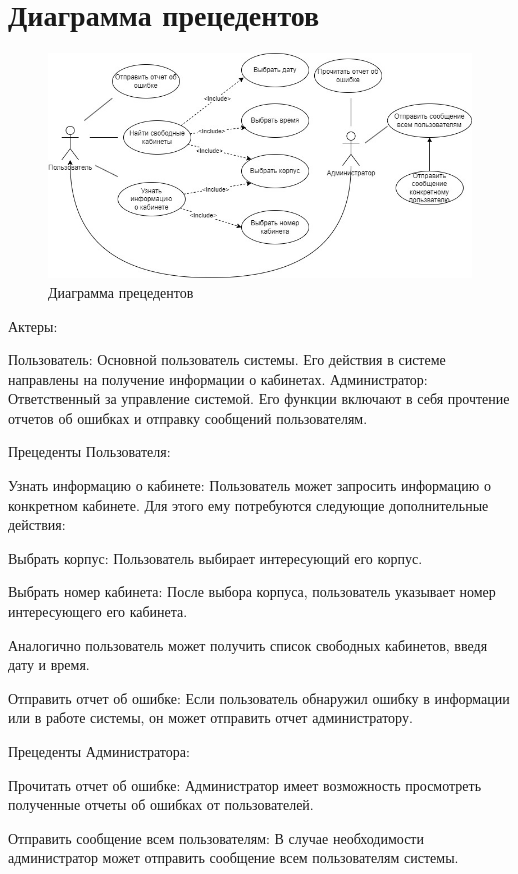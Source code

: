 \chapter{Диаграмма прецедентов}

\begin{figure}[h]
    \centering
    \includegraphics[scale=0.6]{img/prec}
    \caption{Диаграмма прецедентов}
    \label{fig:cp}
\end{figure}

Актеры:

Пользователь: Основной пользователь системы. Его действия в системе направлены
на получение информации о кабинетах.
Администратор: Ответственный за управление системой. Его функции включают в себя
прочтение отчетов об ошибках и отправку сообщений пользователям.

Прецеденты Пользователя:

Узнать информацию о кабинете: Пользователь может запросить информацию о
конкретном кабинете. Для этого ему потребуются следующие дополнительные
действия:

Выбрать корпус: Пользователь выбирает интересующий его корпус.

Выбрать номер кабинета: После выбора корпуса, пользователь указывает номер
интересующего его кабинета.

Аналогично пользователь может получить список свободных кабинетов, введя дату и
время.

Отправить отчет об ошибке: Если пользователь обнаружил ошибку в информации или в
работе системы, он может отправить отчет администратору.

Прецеденты Администратора:

Прочитать отчет об ошибке: Администратор имеет возможность просмотреть
полученные отчеты об ошибках от пользователей.

Отправить сообщение всем пользователям: В случае необходимости администратор
может отправить сообщение всем пользователям системы.

